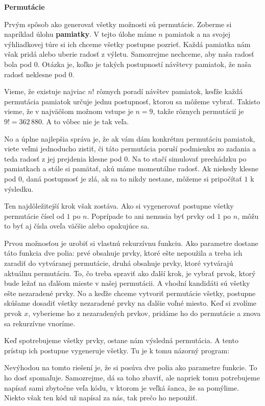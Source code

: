 \textbf{Permutácie}

Prvým spôsob ako generovať všetky možnosti sú permutácie. Zoberme si napríklad úlohu
\textbf{pamiatky}. V tejto úlohe máme $n$ pamiatok a na svojej výhliadkovej túre si ich chceme
všetky postupne pozrieť. Každá pamiatka nám však pridá alebo uberie radosť z výletu. Samozrejme
nechceme, aby naša radosť bola pod $0$. Otázka je, koľko je takých postupností návštevy pamiatok, že
naša radosť neklesne pod $0$.

Vieme, že existuje najviac $n!$ rôznych poradí návštev pamiatok, keďže každá permutácia pamiatok určuje jednu
postupnosť, ktorou sa môžeme vybrať. Takisto vieme, že v najväčšom možnom vstupe je $n=9$, takže
rôznych permutácií je $9!=362\,880$. A to vôbec nie je tak veľa.

No a úplne najlepšia správa je, že ak vám dám konkrétnu permutáciu pamiatok, viete veľmi jednoducho
zistiť, či táto permutácia poruší podmienku zo zadania a teda radosť z jej prejdenia klesne pod $0$.
Na to stačí simulovať prechádzku po pamiatkach a stále si pamätať, akú máme momentálne radosť. Ak
niekedy klesne pod $0$, daná postupnosť je zlá, ak sa to nikdy nestane, môžeme si pripočítať $1$ k
výsledku.

Ten najdôležitejší krok však zostáva. Ako si vygenerovať postupne všetky permutácie čísel od $1$ po
$n$. Poprípade to ani nemusia byť prvky od $1$ po $n$, môžu to byť aj čísla oveľa väčšie alebo
opakujúce sa.

\medskip

Prvou možnosťou je urobiť si vlastnú rekurzívnu funkciu. Ako parametre dostane táto funkcia dve
polia: prvé obsahuje prvky, ktoré ešte nepoužila a treba ich zaradiť do vytváranej permutácie, druhá
obsahuje prvky, ktoré vytvárajú aktuálnu permutáciu. To, čo treba spraviť ako ďalší krok, je vybrať
prvok, ktorý bude ležať na ďalšom mieste v našej permutácii. A vhodní kandidáti sú všetky ešte
nezaradené prvky. No a keďže chceme vytvoriť permutácie všetky, postupne skúšame dosadiť všetky
nezaradené prvky na ďalšie voľné miesto. Keď si zvolíme prvok $x$, vyberieme ho z nezaradených prvkov,
pridáme ho do permutácie a znova sa rekurzívne vnoríme.

Keď spotrebujeme všetky prvky, ostane nám výsledná permutácia. A tento prístup ich postupne
vygeneruje všetky. Tu je k tomu názorný program:


Nevýhodou na tomto riešení je, že si posúva dve polia ako parametre funkcie. To ho dosť spomaľuje.
Samozrejme, dá sa toho zbaviť, ale napriek tomu potrebujeme napísať sami zbytočne veľa kódu, v
ktorom je veľká šanca, že sa pomýlime. Niekto však ten kód už napísal za nás, tak prečo ho nepoužiť.

